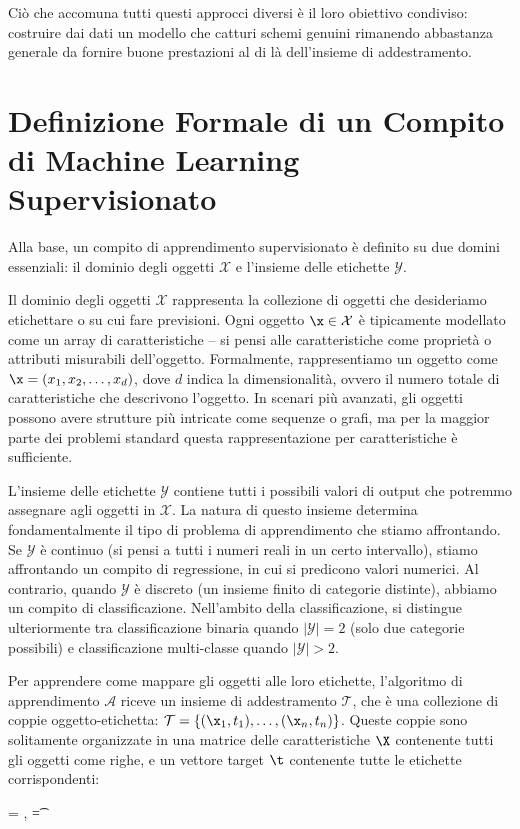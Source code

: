 Ciò che accomuna tutti questi approcci diversi è il loro obiettivo condiviso: costruire dai dati un modello che catturi schemi genuini rimanendo abbastanza generale da fornire buone prestazioni al di là dell'insieme di addestramento.

 \section*{Definizione Formale di un Compito di Machine Learning Supervisionato}

Alla base, un compito di apprendimento supervisionato è definito su due domini essenziali: il \alert{dominio degli oggetti} $\mathcal{X}$ e l'\alert{insieme delle etichette} $\mathcal{Y}$.

Il dominio degli oggetti $\mathcal{X}$ rappresenta la collezione di oggetti che desideriamo etichettare o su cui fare previsioni. Ogni oggetto $\x \in \mathcal{X}$ è tipicamente modellato come un array di \alert{caratteristiche} -- si pensi alle caratteristiche come proprietà o attributi misurabili dell'oggetto. Formalmente, rappresentiamo un oggetto come $\x = (x_1, x_2, \ldots, x_d)$, dove $d$ indica la \alert{dimensionalità}, ovvero il numero totale di caratteristiche che descrivono l'oggetto. In scenari più avanzati, gli oggetti possono avere strutture più intricate come sequenze o grafi, ma per la maggior parte dei problemi standard questa rappresentazione per caratteristiche è sufficiente.

L'insieme delle etichette $\mathcal{Y}$ contiene tutti i possibili valori di output che potremmo assegnare agli oggetti in $\mathcal{X}$. La natura di questo insieme determina fondamentalmente il tipo di problema di apprendimento che stiamo affrontando. Se $\mathcal{Y}$ è continuo (si pensi a tutti i numeri reali in un certo intervallo), stiamo affrontando un compito di \alert{regressione}, in cui si predicono valori numerici. Al contrario, quando $\mathcal{Y}$ è discreto (un insieme finito di categorie distinte), abbiamo un compito di \alert{classificazione}. Nell'ambito della classificazione, si distingue ulteriormente tra \alert{classificazione binaria} quando $|\mathcal{Y}| = 2$ (solo due categorie possibili) e \alert{classificazione multi-classe} quando $|\mathcal{Y}| > 2$.

Per apprendere come mappare gli oggetti alle loro etichette, l'algoritmo di apprendimento $\mathcal{A}$ riceve un \alert{insieme di addestramento} $\mathcal{T}$, che è una collezione di coppie oggetto-etichetta: $\mathcal{T} = \{(\x_1, t_1), \ldots, (\x_n, t_n)\}$. Queste coppie sono solitamente organizzate in una \alert{matrice delle caratteristiche} $\X$ contenente tutti gli oggetti come righe, e un \alert{vettore target} $\t$ contenente tutte le etichette corrispondenti:
\begin{myequation}
\X = , \quad \t = 
\end{myequation}

